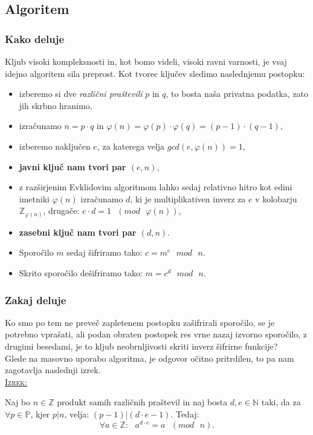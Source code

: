 \documentclass[a4paper, 12pt]{article} %
\newenvironment{matematika}[1]{
\textcolor{bostonuniversityred}{\underline{\textsc{#1:}}}
}{
}
\begin{document}
\subsection{Algoritem}

\subsubsection{Kako deluje}
Kljub visoki kompleksnosti in, kot bomo videli, visoki ravni varnosti, je vsaj idejno algoritem sila preprost. Kot tvorec ključev sledimo naslednjemu postopku:
\begin{itemize}[label=]
\item izberemo si dve \emph{različni praštevili} $p$ in $q$, to bosta naša privatna podatka, zato jih skrbno hranimo,
\item izračunamo $n=p \cdot q$ in $\varphi (n) = \varphi (p) \cdot \varphi (q) = (p-1) \cdot (q-1),$
\item izberemo naključen $e$, za katerega velja $gcd(e, \varphi (n)) = 1$,
\item \textbf{javni ključ nam tvori par $(e, n)$},
\item z razširjenim Evklidovim algoritmom lahko sedaj relativno hitro kot edini imetniki $\varphi (n)$ izračunamo $d$, ki je multiplikativen inverz za $e$ v kolobarju $\mathbb{Z}_{\varphi (n)}$, drugače: $e \cdot d = 1 \text{ } (mod \text{ } \varphi (n))$,
\item \textbf{zasebni ključ nam tvori par $(d, n)$}.
\item Sporočilo $m$ sedaj šifriramo tako: $c = m^e \text{ } mod \text{ } n$.
\item Skrito sporočilo dešifriramo tako: $m = c^d \text{ } mod \text{ } n$.
\end{itemize}

\subsubsection{Zakaj deluje}

Ko smo po tem ne preveč zapletenem postopku zašifrirali sporočilo, se je potrebno vprašati, ali podan obraten postopek res vrne nazaj izvorno sporočilo, z drugimi besedami, je to kljub neobrnljivosti skriti inverz šifrirne funkcije? \\
Glede na masovno uporabo algoritma, je odgovor očitno pritrdilen, to pa nam zagotavlja naslednji izrek. \\

\begin{matematika}{Izrek}
Naj bo $n \in \mathbb{Z}$ produkt samih različnih praštevil in naj bosta $d, e \in \mathbb{N}$ taki, da za $\forall p \in \mathbb{P}$, kjer $p|n$, velja: $(p-1)|(d \cdot e - 1)$. Tedaj:
\[
\forall a \in \mathbb{Z}: \text{ } a^{d \cdot e} = a \text{ } (mod \text{ } n).
\]
\end{matematika}
\end{document}
